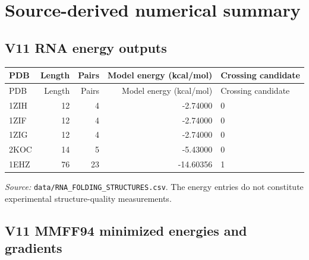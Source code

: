\documentclass[11pt,a4paper]{article}
\begin{document}
\clearpage\section{Source-derived numerical summary}

\subsection{V11 RNA energy outputs}

\begin{center}\small\begin{longtable}{lrrrl}
\toprule
PDB & Length & Pairs & Model energy (kcal/mol) & Crossing candidate\\
\midrule
\endfirsthead
\toprule
PDB & Length & Pairs & Model energy (kcal/mol) & Crossing candidate\\
\midrule
\endhead
1ZIH & 12 & 4 & -2.74000 & 0\\
1ZIF & 12 & 4 & -2.74000 & 0\\
1ZIG & 12 & 4 & -2.74000 & 0\\
2KOC & 14 & 5 & -5.43000 & 0\\
1EHZ & 76 & 23 & -14.60356 & 1\\
\bottomrule
\end{longtable}
\end{center}
\textit{Source: } \texttt{data/RNA\_FOLDING\_STRUCTURES.csv}. The energy entries do not constitute experimental structure-quality measurements.
\subsection{V11 MMFF94 minimized energies and gradients}
\end{document}
